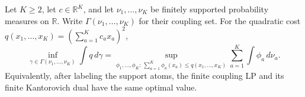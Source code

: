 Let \(K\ge2\), let \(c\in\mathbb R^K\), and let \(\nu_1,\ldots,\nu_K\) be finitely supported probability measures on \(\mathbb R\). Write \(\Gamma(\nu_1,\ldots,\nu_K)\) for their coupling set. For the quadratic cost \(q(x_1,\ldots,x_K)=(\sum_{a=1}^Kc_ax_a)^2\),
\[
\inf_{\gamma\in\Gamma(\nu_1,\ldots,\nu_K)}\int q\,d\gamma
=\sup_{\phi_1,\ldots,\phi_K:\,\sum_{a=1}^K\phi_a(x_a)\le q(x_1,\ldots,x_K)}
\sum_{a=1}^K\int\phi_a\,d\nu_a.
\]
Equivalently, after labeling the support atoms, the finite coupling LP and its finite Kantorovich dual have the same optimal value.